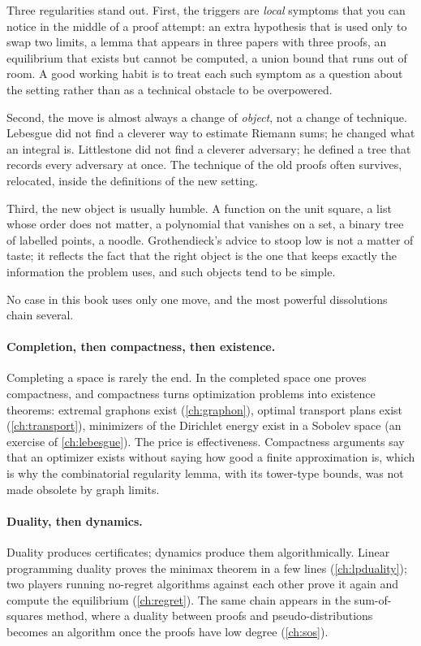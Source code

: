\begin{refsection}
Three regularities stand out. First, the triggers are \emph{local} symptoms that you can notice in the middle of a proof attempt: an extra hypothesis that is used only to swap two limits, a lemma that appears in three papers with three proofs, an equilibrium that exists but cannot be computed, a union bound that runs out of room. A good working habit is to treat each such symptom as a question about the setting rather than as a technical obstacle to be overpowered.

Second, the move is almost always a change of \emph{object}, not a change of technique. Lebesgue did not find a cleverer way to estimate Riemann sums; he changed what an integral is. Littlestone did not find a cleverer adversary; he defined a tree that records every adversary at once. The technique of the old proofs often survives, relocated, inside the definitions of the new setting.

Third, the new object is usually humble. A function on the unit square, a list whose order does not matter, a polynomial that vanishes on a set, a binary tree of labelled points, a noodle. Grothendieck's advice to stoop low is not a matter of taste; it reflects the fact that the right object is the one that keeps exactly the information the problem uses, and such objects tend to be simple.


No case in this book uses only one move, and the most powerful dissolutions chain several.

\paragraph{Completion, then compactness, then existence.} Completing a space is rarely the end. In the completed space one proves compactness, and compactness turns optimization problems into existence theorems: extremal graphons exist (\cref{ch:graphon}), optimal transport plans exist (\cref{ch:transport}), minimizers of the Dirichlet energy exist in a Sobolev space (an exercise of \cref{ch:lebesgue}). The price is effectiveness. Compactness arguments say that an optimizer exists without saying how good a finite approximation is, which is why the combinatorial regularity lemma, with its tower-type bounds, was not made obsolete by graph limits.

\paragraph{Duality, then dynamics.} Duality produces certificates; dynamics produce them algorithmically. Linear programming duality proves the minimax theorem in a few lines (\cref{ch:lpduality}); two players running no-regret algorithms against each other prove it again and compute the equilibrium (\cref{ch:regret}). The same chain appears in the sum-of-squares method, where a duality between proofs and pseudo-distributions becomes an algorithm once the proofs have low degree (\cref{ch:sos}).


\end{refsection}
